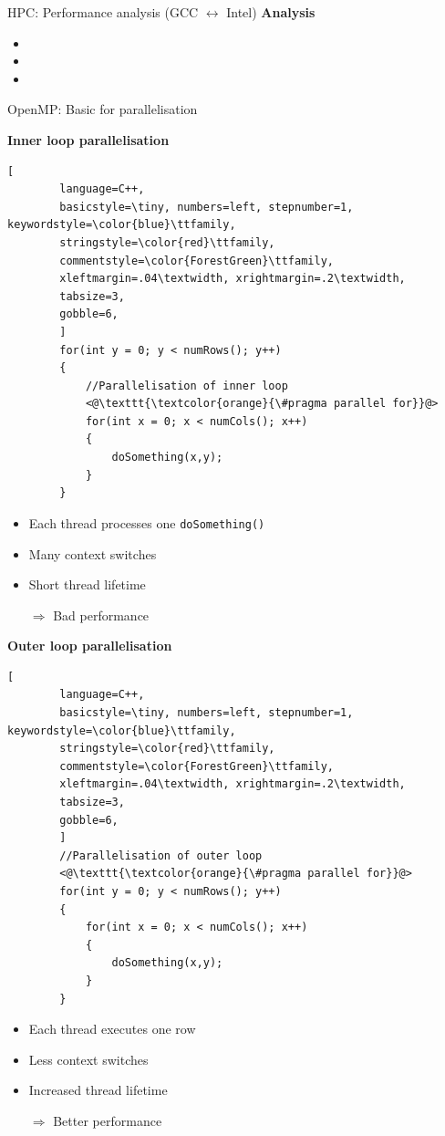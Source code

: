 \documentclass[shortpres,usenames,dvipsnames]{beamer}
\begin{document}
\begin{frame}{HPC: Performance analysis (GCC $\leftrightarrow$ Intel)}
	\textbf{Analysis}
	\begin{itemize}
		\item
		\item 
		\item
	\end{itemize}
\end{frame}

\begin{frame}[containsverbatim]{OpenMP: Basic for parallelisation}
	\begin{multicols}{2}
		\textbf{Inner loop parallelisation}
		\begin{lstlisting}[
		language=C++,
		basicstyle=\tiny, numbers=left, stepnumber=1, keywordstyle=\color{blue}\ttfamily,
		stringstyle=\color{red}\ttfamily,
		commentstyle=\color{ForestGreen}\ttfamily,
		xleftmargin=.04\textwidth, xrightmargin=.2\textwidth,
		tabsize=3,
		gobble=6,
		]
		for(int y = 0; y < numRows(); y++)
		{
			//Parallelisation of inner loop
			<@\texttt{\textcolor{orange}{\#pragma parallel for}}@>
			for(int x = 0; x < numCols(); x++)
			{
				doSomething(x,y);
			}
		}
		\end{lstlisting}
		
		\begin{itemize}
			\item Each thread processes one \verb|doSomething()|
			\item Many context switches
			\item Short thread lifetime
			\item[$\Rightarrow$] Bad performance 
		\end{itemize}
		
		\columnbreak
		
		\textbf{Outer loop parallelisation}
		\begin{lstlisting}[
		language=C++,
		basicstyle=\tiny, numbers=left, stepnumber=1, keywordstyle=\color{blue}\ttfamily,
		stringstyle=\color{red}\ttfamily,
		commentstyle=\color{ForestGreen}\ttfamily,
		xleftmargin=.04\textwidth, xrightmargin=.2\textwidth,
		tabsize=3,
		gobble=6,
		]
		//Parallelisation of outer loop
		<@\texttt{\textcolor{orange}{\#pragma parallel for}}@>
		for(int y = 0; y < numRows(); y++)
		{
			for(int x = 0; x < numCols(); x++)
			{
				doSomething(x,y);
			}
		}
		\end{lstlisting}
		
		\begin{itemize}
			\item Each thread executes one row
			\item Less context switches
			\item Increased thread lifetime
			\item[$\Rightarrow$] Better performance
		\end{itemize}
	\end{multicols}
\end{frame}
\end{document}
